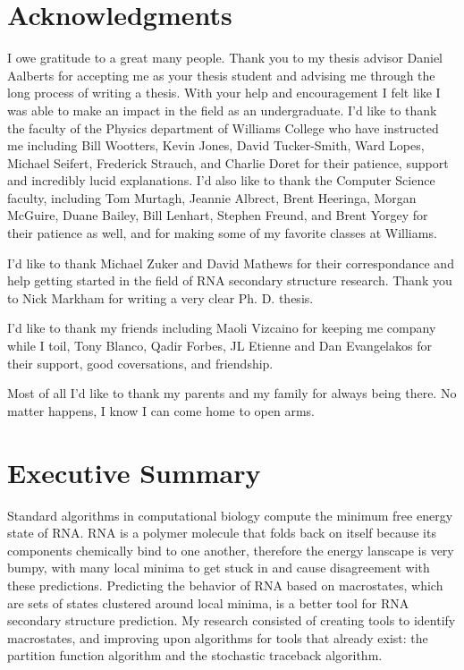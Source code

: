 % 



\section*{Acknowledgments}

I owe gratitude to a great many people. Thank you to my thesis advisor
Daniel Aalberts for accepting me as your thesis student and advising
me through the long process of writing a thesis. With your help and
encouragement I felt like I was able to make an impact in the field as
an undergraduate. I'd like to thank the faculty of the Physics
department of Williams College who have instructed me including Bill
Wootters, Kevin Jones, David Tucker-Smith, Ward Lopes, Michael
Seifert, Frederick Strauch, and Charlie Doret for their patience,
support and incredibly lucid explanations. I'd also like to thank the
Computer Science faculty, including Tom Murtagh, Jeannie Albrect,
Brent Heeringa, Morgan McGuire, Duane Bailey, Bill Lenhart, Stephen
Freund, and Brent Yorgey for their patience as well, and for making
some of my favorite classes at Williams.

I'd like to thank Michael Zuker and David Mathews for their
correspondance and help getting started in the field of RNA secondary
structure research. Thank you to Nick Markham for writing a very clear
Ph. D. thesis. 

I'd like to thank my friends including Maoli Vizcaino for keeping me
company while I toil, Tony Blanco, Qadir Forbes, JL Etienne and Dan
Evangelakos for their support, good coversations, and friendship. 

Most of all I'd like to thank my parents and my family for always
being there. No matter happens, I know I can come home to open arms.

\newpage

\section*{Executive Summary}

Standard algorithms in computational biology compute the minimum free
energy state of RNA. RNA is a polymer molecule that folds back on
itself because its components chemically bind to one another,
therefore the energy lanscape is very bumpy, with many local minima to
get stuck in and cause disagreement with these predictions. Predicting
the behavior of RNA based on macrostates, which are sets of states
clustered around local minima, is a better tool for RNA secondary
structure prediction. My research consisted of creating tools to
identify macrostates, and improving upon algorithms for tools that
already exist: the partition function algorithm and the stochastic
traceback algorithm.

